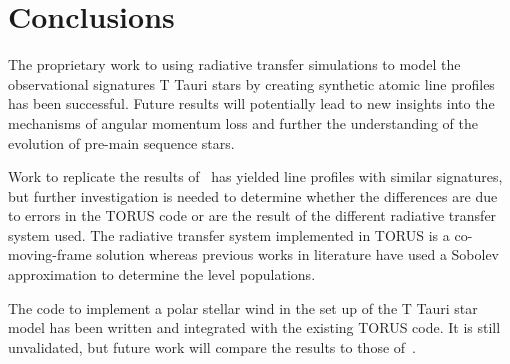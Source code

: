 \documentclass[fleqn,usenatbib]{mnras}
\begin{document}
\section{Conclusions}
\label{sec:conclusions}
The proprietary work to using radiative transfer simulations to model the observational signatures T Tauri stars by creating synthetic atomic line profiles has been successful. Future results will potentially lead to new insights into the mechanisms of angular momentum loss and further the understanding of the evolution of pre-main sequence stars.

Work to replicate the results of~\citep{1998ApJ...492..743M} has yielded line profiles with similar signatures, but further investigation is needed to determine whether the differences are due to errors in the TORUS code or are the result of the different radiative transfer system used. The radiative transfer system implemented in TORUS is a co-moving-frame solution whereas previous works in literature \citep[e.g.][]{Lima:2010bo,Kurosawa:2006gd,1998ApJ...492..743M,Hartmann:1994tl} have used a Sobolev approximation to determine the level populations.

The code to implement a polar stellar wind in the set up of the T Tauri star model has been written and integrated with the existing TORUS code. It is still unvalidated, but future work will compare the results to those of~\citet{Kurosawa:2011fh}.











\bsp    %
\label{lastpage}
\end{document}

